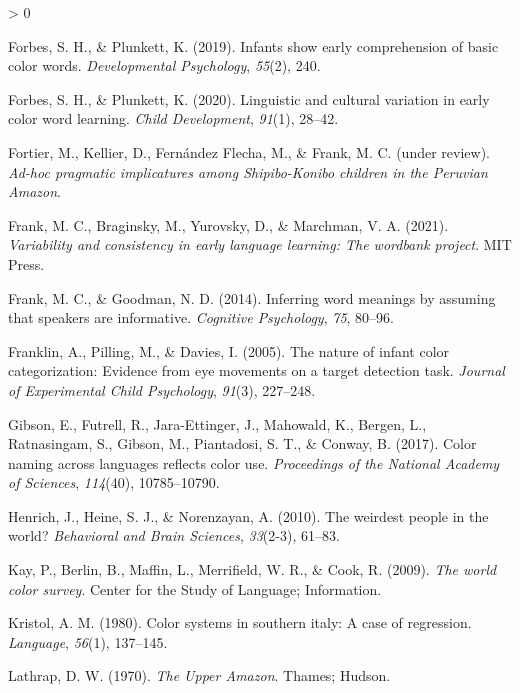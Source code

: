 \documentclass[
  english,
  ,apa7,floatsintext]{apa6}
\newlength{\cslhangindent}
\newenvironment{CSLReferences}[2] %
 {%
  \setlength{\parindent}{0pt}
  \ifodd #1 \everypar{\setlength{\hangindent}{\cslhangindent}}\ignorespaces\fi
  \ifnum #2 > 0
  \setlength{\parskip}{#2\baselineskip}
  \fi
 }%
 {}
\begin{document}
\begin{CSLReferences}{1}{0}
\leavevmode\hypertarget{ref-forbes2019}{}%
Forbes, S. H., \& Plunkett, K. (2019). Infants show early comprehension of basic color words. \emph{Developmental Psychology}, \emph{55}(2), 240.

\leavevmode\hypertarget{ref-forbes2020}{}%
Forbes, S. H., \& Plunkett, K. (2020). Linguistic and cultural variation in early color word learning. \emph{Child Development}, \emph{91}(1), 28--42.

\leavevmode\hypertarget{ref-fortierunderreview}{}%
Fortier, M., Kellier, D., Fernández Flecha, M., \& Frank, M. C. (under review). \emph{Ad-hoc pragmatic implicatures among {S}hipibo-{K}onibo children in the {P}eruvian {A}mazon}.

\leavevmode\hypertarget{ref-frank2020}{}%
Frank, M. C., Braginsky, M., Yurovsky, D., \& Marchman, V. A. (2021). \emph{Variability and consistency in early language learning: The wordbank project}. MIT Press.

\leavevmode\hypertarget{ref-frank2014}{}%
Frank, M. C., \& Goodman, N. D. (2014). Inferring word meanings by assuming that speakers are informative. \emph{Cognitive Psychology}, \emph{75}, 80--96.

\leavevmode\hypertarget{ref-franklin2005}{}%
Franklin, A., Pilling, M., \& Davies, I. (2005). The nature of infant color categorization: Evidence from eye movements on a target detection task. \emph{Journal of Experimental Child Psychology}, \emph{91}(3), 227--248.

\leavevmode\hypertarget{ref-gibson2017}{}%
Gibson, E., Futrell, R., Jara-Ettinger, J., Mahowald, K., Bergen, L., Ratnasingam, S., Gibson, M., Piantadosi, S. T., \& Conway, B. (2017). Color naming across languages reflects color use. \emph{Proceedings of the National Academy of Sciences}, \emph{114}(40), 10785--10790.

\leavevmode\hypertarget{ref-henrich2010}{}%
Henrich, J., Heine, S. J., \& Norenzayan, A. (2010). The weirdest people in the world? \emph{Behavioral and Brain Sciences}, \emph{33}(2-3), 61--83.

\leavevmode\hypertarget{ref-berlin2009}{}%
Kay, P., Berlin, B., Maffin, L., Merrifield, W. R., \& Cook, R. (2009). \emph{The world color survey}. Center for the Study of Language; Information.

\leavevmode\hypertarget{ref-kristol1980}{}%
Kristol, A. M. (1980). Color systems in southern italy: A case of regression. \emph{Language}, \emph{56}(1), 137--145.

\leavevmode\hypertarget{ref-lathrap1970}{}%
Lathrap, D. W. (1970). \emph{The {U}pper {A}mazon}. Thames; Hudson.


\end{CSLReferences}
\end{document}
